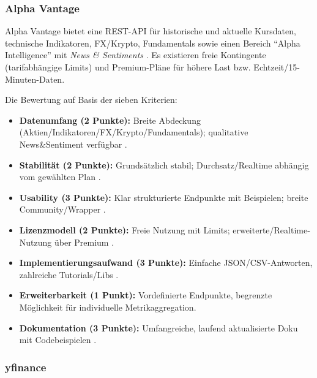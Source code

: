     \subsubsection{Alpha Vantage}

      Alpha Vantage bietet eine \acs{REST}-\acs{API} für historische und aktuelle Kursdaten, technische Indikatoren, FX/Krypto, Fundamentals sowie einen Bereich \enquote{Alpha Intelligence} mit \emph{News \& Sentiments} \autocite{AlphaVantageDocs2025}.
      Es existieren freie Kontingente (tarifabhängige Limits) und Premium-Pläne für höhere Last bzw. Echtzeit/15-Minuten-Daten.

      Die Bewertung auf Basis der sieben Kriterien:
      \begin{itemize}
        \item \textbf{Datenumfang (2 Punkte):} Breite Abdeckung (Aktien/Indikatoren/FX/Krypto/Fundamentals); qualitative News\&Sentiment verfügbar \autocite{AlphaVantageDocs2025}.
        \item \textbf{Stabilität (2 Punkte):} Grundsätzlich stabil; Durchsatz/Realtime abhängig vom gewählten Plan \autocite{AlphaVantageDocs2025}.
        \item \textbf{Usability (3 Punkte):} Klar strukturierte Endpunkte mit Beispielen; breite Community/Wrapper \autocite{AlphaVantageDocs2025}.
        \item \textbf{Lizenzmodell (2 Punkte):} Freie Nutzung mit Limits; erweiterte/Realtime-Nutzung über Premium \autocite{AlphaVantageDocs2025}.
        \item \textbf{Implementierungsaufwand (3 Punkte):} Einfache JSON/CSV-Antworten, zahlreiche Tutorials/Libs \autocite{AlphaVantageDocs2025}.
        \item \textbf{Erweiterbarkeit (1 Punkt):} Vordefinierte Endpunkte, begrenzte Möglichkeit für individuelle Metrikaggregation.
        \item \textbf{Dokumentation (3 Punkte):} Umfangreiche, laufend aktualisierte Doku mit Codebeispielen \autocite{AlphaVantageDocs2025}.
      \end{itemize}

      \global\def\ValphaVantageDaten{2}
      \global\def\ValphaVantageStabilität{2}
      \global\def\ValphaVantageUsability{3}
      \global\def\ValphaVantageLizenz{2}
      \global\def\ValphaVantageImplement{3}
      \global\def\ValphaVantageErweiterung{1}
      \global\def\ValphaVantageDokumentation{3}

    \subsubsection{yfinance}

